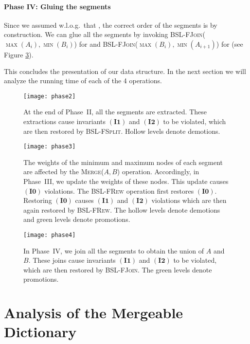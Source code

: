 \documentclass[11pt]{article}
\newcommand{\kwUnion}{Merge}
\newcommand{\Unionx}[2]{\mbox{\textsc{\kwUnion(\ensuremath{#1,#2})}}}
\newcommand{\Bslfspl}{\mbox{\textsc{BSL-FSplit}}}
\newcommand{\Bslfjoin}{\mbox{\textsc{BSL-FJoin}}}
\newcommand{\Bslfjoinx}[2]{\mbox{\textsc{BSL-FJoin(\ensuremath{#1,#2})}}}
\newcommand{\Bslfrew}{\mbox{\textsc{BSL-FRew}}}
\newcommand{\opcount}{4}
\newcommand{\segments}{{\segment}s}
\newcommand{\segment}{segment}
\newcommand{\invzero}{\ensuremath{\mathbf{(I0)}}}
\newcommand{\invone}{\ensuremath{\mathbf{(I1)}}}
\newcommand{\invtwo}{\ensuremath{\mathbf{(I2)}}}
\newcommand{\intmax}[1]{\ensuremath{\max(\intl #1)}}
\newcommand{\intmin}[1]{\ensuremath{\min(\intl #1)}}
\newcommand{\intl}[1]{\ensuremath{#1}}
\newcommand{\set}[1]{\ensuremath{#1}}
\newcounter{count}
\begin{document}
\paragraph{Phase IV: Gluing the \segments{}} Since we assumed w.l.o.g.~that , the correct order of the \segments{} is  by construction. We can glue all the \segments{} by invoking \Bslfjoinx{\intmax{A_{i}}}{\intmin{B_i}} for  and \Bslfjoinx{\intmax{B_{i}}}{\intmin{A_{i+1}}} for  (see Figure \ref{fig:glueints}). 

This concludes the presentation of our data structure. In the next section we will analyze the running time of each of the \opcount{} operations. 


\begin{figure}[H]
\centering 
\texttt{[image: phase2]} 
\caption{At the end of Phase~II, all the \segments{} are extracted. These extractions cause invariants \invone{} and \invtwo{} to be violated, which are then restored by \Bslfspl{}. Hollow levels denote demotions.} 
\label{fig:extractints} 
\end{figure}

\begin{figure}[H]
\centering 
\texttt{[image: phase3]} 
\caption{The weights of the minimum and maximum nodes of each \segment{} are affected by the \Unionx{A}{B} operation. Accordingly, in Phase~III, we update the weights of these nodes. This update causes \invzero{} violations. The \Bslfrew{} operation first restores \invzero{}. Restoring \invzero{} causes \invone{} and \invtwo{} violations which are then again restored by \Bslfrew{}. The hollow levels denote demotions and green levels denote promotions.} 
\label{fig:updateweights} 
\end{figure}

\begin{figure}[H]
\centering 
\texttt{[image: phase4]} 
\caption{In Phase~IV, we join all the \segments{} to obtain the union of \set A and \set B. These joins cause invariants \invone{} and \invtwo{} to be violated, which are then restored by \Bslfjoin{}. The green levels denote promotions.} 
\label{fig:glueints} 
\end{figure} 






\section{Analysis of the Mergeable Dictionary} 
\label{sec:Analysis} 
\end{document}
